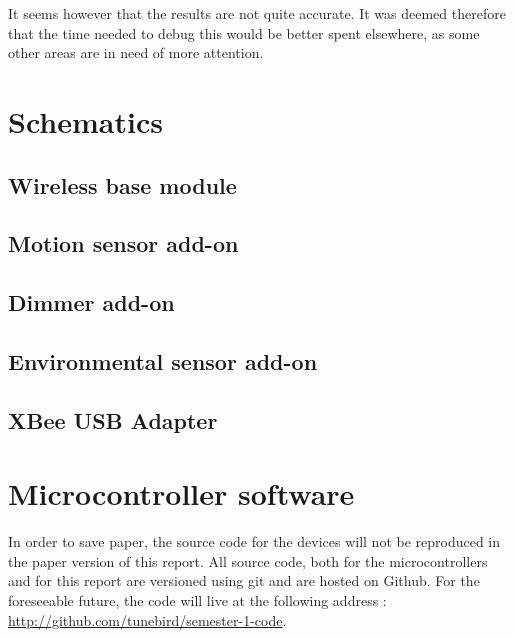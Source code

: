 It seems however that the results are not quite accurate. It was deemed
therefore that the time needed to debug this would be better spent elsewhere, as
some other areas are in need of more attention.

\pagebreak
\section{Schematics}
\subsection{Wireless base module}
\label{sub:sch-wirelessmodule}


\subsection{Motion sensor add-on}
\label{sub:sch-motionboard}


\subsection{Dimmer add-on}
\label{sub:sch-dimmerboard}


\subsection{Environmental sensor add-on}
\label{sub:sch-sensorsboard}


\subsection{XBee USB Adapter}
\label{sub:sch-usbboard}


\pagebreak
\section{Microcontroller software}

In order to save paper, the source code for the devices will not be reproduced
in the paper version of this report. All source code, both for the
microcontrollers and for this report are versioned using git and are hosted on 
Github. For the foreseeable future, the code will live
at the following address : \url{http://github.com/tunebird/semester-1-code}.

